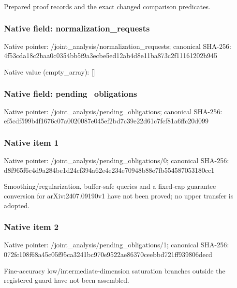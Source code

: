 \documentclass[10pt,a4paper]{article}
\begin{document}
\begingroup\raggedright\sloppy Prepared proof records and the exact changed comparison predicates.\par\endgroup

\subsubsection{Native field: normalization\_\allowbreak{}requests}
Native pointer: /joint\_\allowbreak{}analysis/normalization\_\allowbreak{}requests; canonical SHA-256: 4f53cda18c2baa0c0354bb5f9a3ecbe5ed12ab4d8e11ba873c2f11161202b945

Native value (empty\_\allowbreak{}array): []

\subsubsection{Native field: pending\_\allowbreak{}obligations}
Native pointer: /joint\_\allowbreak{}analysis/pending\_\allowbreak{}obligations; canonical SHA-256: ef5cdf599b4f1676c07a0020087e045ef2bd7c39e22d61c7fcf81a6ffc20d099

\subsubsection{Native item 1}
Native pointer: /joint\_\allowbreak{}analysis/pending\_\allowbreak{}obligations/0; canonical SHA-256: d8f965f6c4d9a284be1d24cf394a62e4e234e70948b88e7fb554587053180cc1

\begingroup\raggedright\sloppy Smoothing/\allowbreak{}regularization,\allowbreak{} buffer-safe queries and a fixed-cap guarantee conversion for arXiv:\allowbreak{}2407.09190v1 have not been proved;\allowbreak{} no upper transfer is adopted.\par\endgroup

\subsubsection{Native item 2}
Native pointer: /joint\_\allowbreak{}analysis/pending\_\allowbreak{}obligations/1; canonical SHA-256: 072fc108f68a45c05f95ca3241bc970e9522ae86370ceebbd721ff939806decd

\begingroup\raggedright\sloppy Fine-accuracy low/\allowbreak{}intermediate-dimension saturation branches outside the registered guard have not been assembled.\par\endgroup
\end{document}
